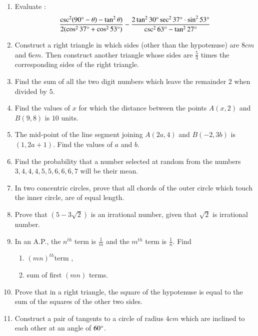 \documentclass[2pt,-letter paper]{article}
\providecommand{\brak}[1]{\ensuremath{\left(#1\right)}}
\begin{document}
\begin{enumerate}
\item Evaluate :
\begin{align*}
    {\frac{\csc^2(90\degree - \theta)-\tan^2\theta)}{2(\cos^2 37\degree + \cos^2 53\degree)}} - {\frac{2\tan^2 30\degree \sec^2 37\degree \cdot \sin^2 53\degree}{\csc^2 63\degree - \tan^2 27\degree}} 
\end{align*}

\item Construct a right triangle in which sides (other than the hypotenuse) are $8 cm$ and $6 cm$. Then construct another triangle whose sides are $\frac{5}{3}$ times the corresponding sides of the right triangle.

\item Find the sum of all the two digit numbers which leave the remainder $2$ when divided by $5$.
\item Find the values of $x$ for which the distance between the points $A\brak{x, 2}$ and $B\brak{9, 8}$ is $10$ units.

\item The mid-point of the line segment joining $A\brak{2a, 4}$ and $B\brak{-2, 3b}$ is $\brak{1, 2a + 1}$. Find the values of $a$ and $b$.

\item Find the probability that a number selected at random from the numbers $3, 4, 4, 4, 5, 5, 6, 6, 6, 7$ will be their mean.


\item In two concentric circles, prove that all chords of the outer circle which touch the inner circle, are of equal length.

\item Prove that $\brak{5 - 3{\sqrt 2}}$ is an irrational number, given that ${\sqrt2}$ is irrational number.

\item In an A.P., the $n^{th}$ term is ${\frac{1}{m}}$ and the $m^{th}$ term is $\frac{1}{n}$. Find \begin{enumerate}
     \item  $\brak{mn}^{th}$term  ,
     \item sum of first $\brak{mn}$ terms.
\end{enumerate}

\item Prove that in a right triangle, the square of the hypotenuse is equal to the sum of the squares of the other two sides.

\item Construct a pair of tangents to a circle of radius $4 cm$ which are inclined to each other at an angle of $60\degree$.

\end{enumerate}
\end{document}
